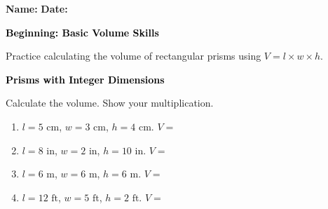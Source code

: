\documentclass[12pt, letterpaper, fleqn]{article}
\newcommand{\blank}{\underline{\hspace{2.2cm}}}
\begin{document}
\textbf{Name:} \underline{\hspace{5cm}}
\hfill
\textbf{Date:} \underline{\hspace{3cm}}\\

\begin{tcolorbox}[colback=black!10]
    \large\textcolor{black}{\textbf{Beginning: Basic Volume Skills}}
\end{tcolorbox}

\vspace{3mm}

\noindent
Practice calculating the volume of rectangular prisms using $V = l \times w \times h$.

\vspace{4mm}

\begin{tcolorbox}[colback=black!10]
\large\textcolor{black}{\textbf{Prisms with Integer Dimensions}}
\end{tcolorbox}

\noindent
Calculate the volume. Show your multiplication.

\vspace{3mm}

\begin{enumerate}[itemsep=1.3cm, leftmargin=0.6cm]

\item $l = 5\text{ cm}$, $w = 3\text{ cm}$, $h = 4\text{ cm}$. \quad $V =$ \blank

\vspace{1.5cm}

\item $l = 8\text{ in}$, $w = 2\text{ in}$, $h = 10\text{ in}$. \quad $V =$ \blank

\vspace{1.5cm}

\item $l = 6\text{ m}$, $w = 6\text{ m}$, $h = 6\text{ m}$. \quad $V =$ \blank

\vspace{1.5cm}

\item $l = 12\text{ ft}$, $w = 5\text{ ft}$, $h = 2\text{ ft}$. \quad $V =$ \blank

\vspace{1.5cm}

\end{enumerate}
\end{document}
